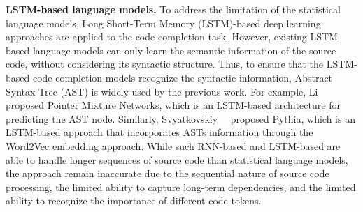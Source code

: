 




\textbf{LSTM-based language models.} To address the limitation of the statistical language models, Long Short-Term Memory (LSTM)-based deep learning approaches are applied to the code completion task.
However, existing LSTM-based language models can only learn the semantic information of the source code, without considering its syntactic structure.
Thus, to ensure that the LSTM-based code completion models recognize the syntactic information, Abstract Syntax Tree (AST) is widely used by the previous work.
For example, Li~\ea~\cite{li2017code} proposed Pointer Mixture Networks, which is an LSTM-based architecture for predicting the AST node. 
Similarly, Svyatkovskiy~\ea~\cite{svyatkovskiy2019pythia} proposed Pythia, which is an LSTM-based approach that incorporates ASTs information through the Word2Vec embedding approach.
While such RNN-based and LSTM-based are able to handle longer sequences of source code than statistical language models, the approach remain inaccurate due to the sequential nature of source code processing, the limited ability to capture long-term dependencies, and the limited ability to recognize the importance of different code tokens.



